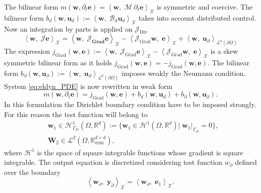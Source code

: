 \documentclass{svjour3}                     %
\DeclareMathOperator*{\Grad}{Grad}
\DeclareMathOperator*{\Div}{Div}
\begin{document}
The bilinear form $m(\bm{w}, \partial_t \bm{e}) = \left\langle \bm{w}, \; \bm{\mathcal{M}} \ \partial_t \bm{e} \right\rangle_{\mathscr{X}}$ is symmetric and coercive. The bilinear form $b_d(\bm{w}, \bm{u}_d):=\left\langle \bm{w}, \; \bm{\mathcal{B}}_d \bm{u}_d \right\rangle_{\mathscr{X}}$ takes into account distributed control.\\
Now an integration by parts is applied on $\bm{\mathcal{J}}_{\Div}$
\begin{equation}
\left\langle \bm{w}, \; \bm{\mathcal{J}} \bm{e} \right\rangle_{\mathscr{X}} = \left\langle \bm{w}, \; \bm{\mathcal{J}_{\Grad}} \bm{e} \right\rangle_{\mathscr{X}} - \left\langle \bm{\mathcal{J}}_{\Grad} \bm{w}, \; \bm{e} \right\rangle_{\mathscr{X}} + \left\langle \bm{w}, \; \bm{u}_\partial \right\rangle_{\mathscr{L}^2(\partial \Omega)}
\end{equation}
The expression $j_{\Grad}(\bm{w}, \bm{e}) :=\left\langle \bm{w}, \; \bm{\mathcal{J}}_{\Grad} \bm{e} \right\rangle_{\mathscr{X}} - \left\langle \bm{\mathcal{J}}_{\Grad} \bm{w}, \; \bm{e} \right\rangle_{\mathscr{X}}$ is a skew symmetric bilinear form as it holds $j_{\Grad}(\bm{w}, \bm{e})=-j_{\Grad}(\bm{w}, \bm{e})$. The bilinear form $b_{\partial}(\bm{w}, \bm{u}_\partial) := \left\langle \bm{w}, \; \bm{u}_\partial \right\rangle_{\mathscr{L}^2(\partial \Omega)}$ imposes weakly the Neumann condition. System \eqref{eq:eldyn_PDE} is now rewritten in weak form
\begin{equation}
m(\bm{w}, \partial_t \bm{e}) = j_{\Grad}(\bm{w}, \bm{e}) + b_d(\bm{w}, \bm{u}_d) + b_{\partial}(\bm{w}, \bm{u}_\partial).
\end{equation}
In this formulation the Dirichlet boundary condition have to be imposed strongly. For this reason the test function will belong to
\begin{align*}
	&\bm{w}_1 \in \mathscr{H}^1_{\Gamma_D}(\Omega, \mathbb{R}^d) := \{\bm{w}_1 \in \mathscr{H}^1(\Omega, \mathbb{R}^d)|\;  \bm{w}_1|_{\Gamma_D} = 0  \}, \\
	&\bm{W}_2 \in \mathscr{L}^2(\Omega, \mathbb{R}^{d\times d}_{\text{sym}}),
\end{align*} 
where $\mathscr{H}^1$ is the space of square integrable functions whose gradient is square integrable. The output equation is discretized considering test function $w_\partial$ defined over the boundary
\begin{equation}
\left\langle \bm{w}_\partial, \; \bm{y}_\partial \right\rangle_{\mathscr{X}} = \left\langle \bm{w}_\partial, \; \bm{e}_1 \right\rangle_{\mathscr{X}}.
\end{equation}
\end{document}
